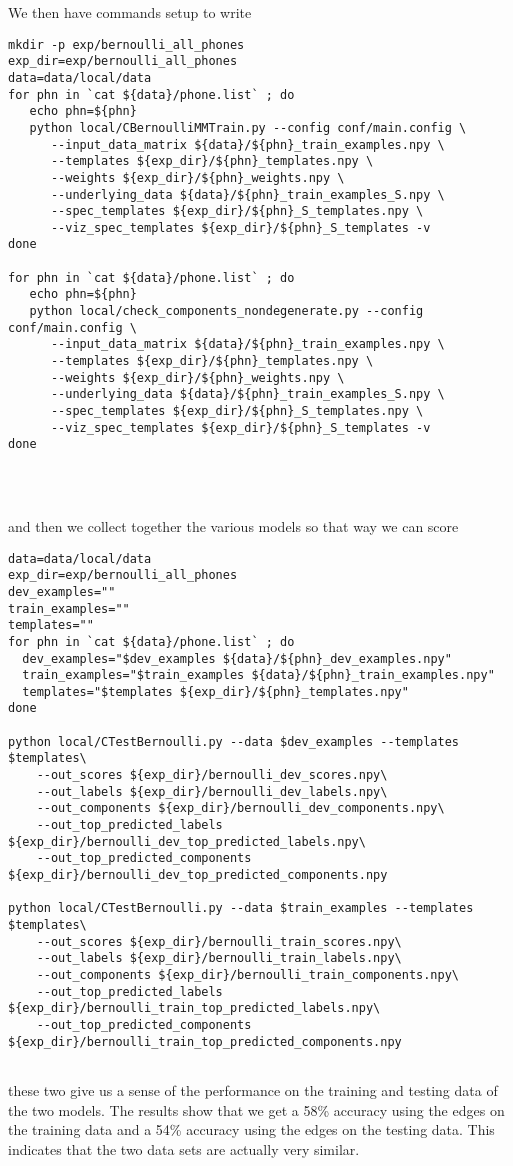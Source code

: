 \documentclass{article}
\begin{document}
We then have commands setup to write
\begin{verbatim}
mkdir -p exp/bernoulli_all_phones
exp_dir=exp/bernoulli_all_phones
data=data/local/data
for phn in `cat ${data}/phone.list` ; do
   echo phn=${phn}
   python local/CBernoulliMMTrain.py --config conf/main.config \
      --input_data_matrix ${data}/${phn}_train_examples.npy \
      --templates ${exp_dir}/${phn}_templates.npy \
      --weights ${exp_dir}/${phn}_weights.npy \
      --underlying_data ${data}/${phn}_train_examples_S.npy \
      --spec_templates ${exp_dir}/${phn}_S_templates.npy \
      --viz_spec_templates ${exp_dir}/${phn}_S_templates -v
done

for phn in `cat ${data}/phone.list` ; do
   echo phn=${phn}
   python local/check_components_nondegenerate.py --config conf/main.config \
      --input_data_matrix ${data}/${phn}_train_examples.npy \
      --templates ${exp_dir}/${phn}_templates.npy \
      --weights ${exp_dir}/${phn}_weights.npy \
      --underlying_data ${data}/${phn}_train_examples_S.npy \
      --spec_templates ${exp_dir}/${phn}_S_templates.npy \
      --viz_spec_templates ${exp_dir}/${phn}_S_templates -v
done




\end{verbatim}

and then we collect together the various models so that way
we can score

\begin{verbatim}
data=data/local/data
exp_dir=exp/bernoulli_all_phones
dev_examples=""
train_examples=""
templates=""
for phn in `cat ${data}/phone.list` ; do
  dev_examples="$dev_examples ${data}/${phn}_dev_examples.npy"
  train_examples="$train_examples ${data}/${phn}_train_examples.npy"
  templates="$templates ${exp_dir}/${phn}_templates.npy"
done

python local/CTestBernoulli.py --data $dev_examples --templates $templates\
    --out_scores ${exp_dir}/bernoulli_dev_scores.npy\
    --out_labels ${exp_dir}/bernoulli_dev_labels.npy\
    --out_components ${exp_dir}/bernoulli_dev_components.npy\
    --out_top_predicted_labels ${exp_dir}/bernoulli_dev_top_predicted_labels.npy\
    --out_top_predicted_components ${exp_dir}/bernoulli_dev_top_predicted_components.npy

python local/CTestBernoulli.py --data $train_examples --templates $templates\
    --out_scores ${exp_dir}/bernoulli_train_scores.npy\
    --out_labels ${exp_dir}/bernoulli_train_labels.npy\
    --out_components ${exp_dir}/bernoulli_train_components.npy\
    --out_top_predicted_labels ${exp_dir}/bernoulli_train_top_predicted_labels.npy\
    --out_top_predicted_components ${exp_dir}/bernoulli_train_top_predicted_components.npy


\end{verbatim}
these two give us a sense of the performance on the training and
testing data of the two models.  The results show that we get
a 58\% accuracy using the edges on the training data and a
54\% accuracy using the edges on the testing data. This indicates
that the two data sets are actually very similar.
\end{document}
